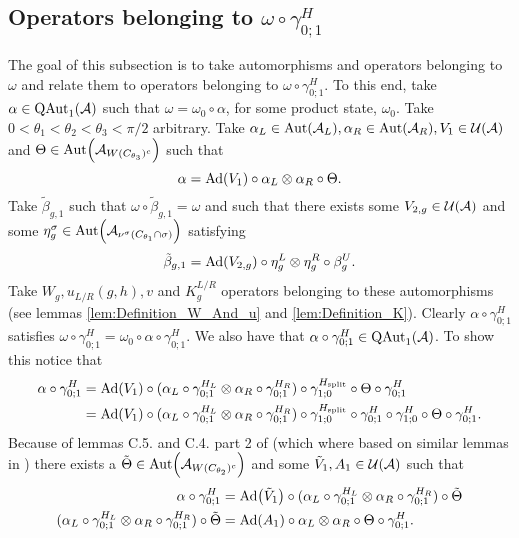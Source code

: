 \documentclass[11pt,a4paper,twoside]{article}
\numberwithin{equation}{section}
\begin{document}
	\subsection{Operators belonging to \texorpdfstring{$\omega\circ\gamma^H_{0;1}$}{}}
	The goal of this subsection is to take automorphisms and operators belonging to $\omega$ and relate them to operators belonging to $\omega\circ\gamma^H_{0;1}$. To this end, take $\alpha\in\QAut{\AA}$ such that $\omega=\omega_0\circ\alpha$, for some product state, $\omega_0$. Take $0<\theta_1<\theta_2<\theta_3<\pi/2$ arbitrary. Take $\alpha_L\in\Aut{\AA_L},\alpha_R\in\Aut{\AA_R},V_1\in\UU(\AA)$ and $\Theta\in\Aut{\AA_{W(C_{\theta_3})^c}}$ such that
	\begin{equation}
		\alpha=\Ad{V_1}\circ\alpha_L\otimes\alpha_R\circ\Theta.
	\end{equation}
	Take $\tilde{\beta}_{g,1}$ such that $\omega\circ\tilde{\beta}_{g,1}=\omega$ and such that there exists some $V_{2,g}\in\mathcal U(\mathcal A)$ and some $\eta_g^{\sigma}\in\Aut{\AA_{\nu^\sigma(C_{\theta_1}\cap \sigma)}}$ satisfying
	\begin{equation}
		\tilde{\beta}_{g,1}=\Ad{V_{2,g}}\circ\eta_{g}^L\otimes\eta_{g}^R\circ\beta_g^U.
	\end{equation}
	Take $W_g,u_{L/R}(g,h),v$ and $K_g^{L/R}$ operators belonging to these automorphisms (see lemmas \ref{lem:Definition_W_And_u} and \ref{lem:Definition_K}). Clearly $\alpha\circ\gamma^H_{0;1}$ satisfies $\omega\circ\gamma^{H}_{0;1}=\omega_0\circ\alpha\circ\gamma^{H}_{0;1}$. We also have that $\alpha\circ\gamma^{H}_{0;1}\in\QAut{\AA}$. To show this notice that
	\begin{align}
		\alpha\circ\gamma^{H}_{0;1}&=\Ad{V_1}\circ(\alpha_L\circ\gamma^{H_L}_{0;1}\otimes\alpha_R\circ\gamma^{H_R}_{0;1})\circ\gamma^{\Hsplit}_{1;0}\circ\Theta\circ\gamma^H_{0;1}\\
		&=\Ad{V_1}\circ(\alpha_L\circ\gamma^{H_L}_{0;1}\otimes\alpha_R\circ\gamma^{H_R}_{0;1})\circ\gamma^{\Hsplit}_{1;0}\circ\gamma^{H}_{0;1}\circ\gamma^{H}_{1;0}\circ\Theta\circ\gamma^H_{0;1}.
	\end{align}
	Because of lemmas C.5. and C.4. part 2 of \cite{jappens2023spt} (which where based on similar lemmas in \cite{ogata2021h3gmathbb}) there exists a $\tilde{\Theta}\in\Aut{\AA_{W(C_{\theta_2})^c}}$ and some $\tilde V_1,A_1\in\mathcal U(\mathcal A)$ such that
	\begin{align}
		\alpha\circ\gamma^H_{0;1}&=\Ad{\tilde V_1}\circ(\alpha_L\circ\gamma^{H_L}_{0;1}\otimes\alpha_R\circ\gamma^{H_R}_{0;1})\circ\tilde\Theta\\
		\label{eq:ProofThatTheH2IndexIsInvariantUnderLGA's_Definition_A1}
		(\alpha_L\circ\gamma^{H_L}_{0;1}\otimes\alpha_R\circ\gamma^{H_R}_{0;1})\circ\tilde\Theta&=\Ad{A_1}\circ \alpha_L\otimes\alpha_R\circ\Theta\circ\gamma^{H}_{0;1}.
	\end{align}
\end{document}
